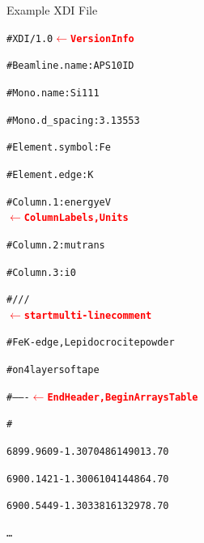 \documentclass[final]{beamer}
\newcommand{\Color}[2]{{\textcolor{#1}{#2}}}
\newcommand{\BoldRed}[1]{{\Color{Red}{\bf{#1}}}}
\begin{document}
\begin{frame}{}
\begin{columns}[t]
      \begin{column}{.42\linewidth}
        \begin{block}{Example XDI File}
          \begin{center}
            \begin{minipage}[t]{0.95\linewidth}
              \begin{alltt}
                {\footnotesize
                  \#XDI/1.0  {\BoldRed{$\leftarrow$ Version Info}}\par
                  \#Beamline.name: APS 10ID\par
                  \#Mono.name:  Si 111\par
                  \#Mono.d\_spacing: 3.13553\par
                  \#Element.symbol: Fe\par
                  \#Element.edge: K\par
                  \#Column.1: energy eV
                  {\BoldRed{$\leftarrow$ Column Labels, Units}}\par
                  \#Column.2: mutrans\par
                  \#Column.3: i0\par
                  \#///
                  {\BoldRed{$\leftarrow$ start multi-line comment}}\par
                  \#Fe K-edge, Lepidocrocite powder\par
                  \#on 4 layers of tape\par
                  \#------- {\BoldRed{$\leftarrow$ End Header, Begin Arrays Table}}\par
                  \#\par
                  \hspace{3mm} 6899.9609 -1.3070486 149013.70\par
                  \hspace{3mm} 6900.1421 -1.3006104 144864.70\par
                  \hspace{3mm} 6900.5449 -1.3033816 132978.70\par
                  \hspace{3mm} \ldots\par
                }
              \end{alltt}
            \end{minipage}
          \end{center}
        \end{block}


\end{column}
\end{columns}
\end{frame}
\end{document}

